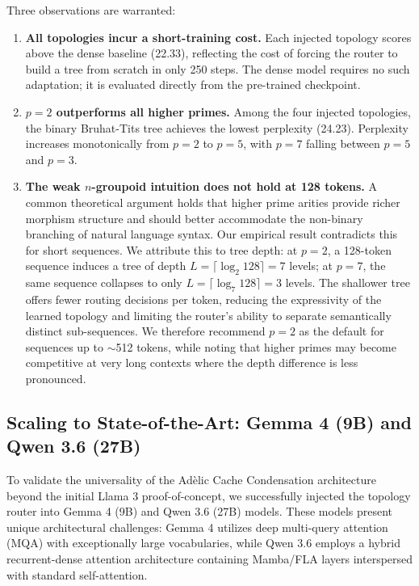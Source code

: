 \documentclass[11pt,a4paper]{article}
\begin{document}
Three observations are warranted:

\begin{enumerate}
    \item \textbf{All topologies incur a short-training cost.} Each injected topology scores above the dense baseline (22.33), reflecting the cost of forcing the router to build a tree from scratch in only 250 steps. The dense model requires no such adaptation; it is evaluated directly from the pre-trained checkpoint.

    \item \textbf{$p = 2$ outperforms all higher primes.} Among the four injected topologies, the binary Bruhat-Tits tree achieves the lowest perplexity (24.23). Perplexity increases monotonically from $p = 2$ to $p = 5$, with $p = 7$ falling between $p = 5$ and $p = 3$.

    \item \textbf{The weak $n$-groupoid intuition does not hold at 128 tokens.} A common theoretical argument holds that higher prime arities provide richer morphism structure and should better accommodate the non-binary branching of natural language syntax. Our empirical result contradicts this for short sequences. We attribute this to tree depth: at $p = 2$, a 128-token sequence induces a tree of depth $L = \lceil \log_2 128 \rceil = 7$ levels; at $p = 7$, the same sequence collapses to only $L = \lceil \log_7 128 \rceil = 3$ levels. The shallower tree offers fewer routing decisions per token, reducing the expressivity of the learned topology and limiting the router's ability to separate semantically distinct sub-sequences. We therefore recommend $p = 2$ as the default for sequences up to $\sim$512 tokens, while noting that higher primes may become competitive at very long contexts where the depth difference is less pronounced.
\end{enumerate}

\subsection{Scaling to State-of-the-Art: Gemma 4 (9B) and Qwen 3.6 (27B)}
\label{sec:scaling}

To validate the universality of the Ad\`elic Cache Condensation architecture beyond the initial Llama 3 proof-of-concept, we successfully injected the topology router into Gemma 4 (9B) and Qwen 3.6 (27B) models. These models present unique architectural challenges: Gemma 4 utilizes deep multi-query attention (MQA) with exceptionally large vocabularies, while Qwen 3.6 employs a hybrid recurrent-dense attention architecture containing Mamba/FLA layers interspersed with standard self-attention.
\end{document}

